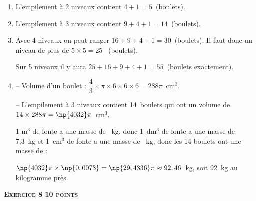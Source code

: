 \documentclass[10pt]{article}
\begin{document}
\begin{enumerate}
	\item %
L'empilement à 2 niveaux contient $4 + 1 = 5$~(boulets).	
	\item %
L'empilement à 3 niveaux contient $9 + 4 + 1 = 14$~(boulets).
	\item %
Avec 4 niveaux on peut ranger $16 + 9 + 4 + 1 = 30$~(boulets). Il faut donc un niveau de plus de $5 \times 5 = 25$ ~(boulets).

Sur 5 niveaux il y aura $25 + 16 + 9 + 4 + 1 = 55$~(boulets exactement).
	\item %
-- Volume d'un boulet : $\dfrac{4}{3} \times \pi \times 6 \times 6 \times 6 = 288\pi$~cm$^3$.

-- L'empilement à 3 niveaux contient 14~boulets qui ont un volume de $14 \times 288\pi = \np{4032}\pi$~cm$^3$.

1 m$^3$ de fonte a une masse de ~kg, donc 1~dm$^3$ de fonte a une masse de 7,3~kg et 1~cm$^3$ de fonte a une masse de ~kg, donc les 14 boulets ont une masse de :

$\np{4032}\pi \times \np{0,0073}= \np{29,4336}\pi \approx 92,46$~kg, soit 92~kg au kilogramme près.
	
%	
	
\end{enumerate}
 
\vspace{0,5cm}

\textbf{\textsc{Exercice 8 \hfill 10 points}}

\medskip
\end{document}
